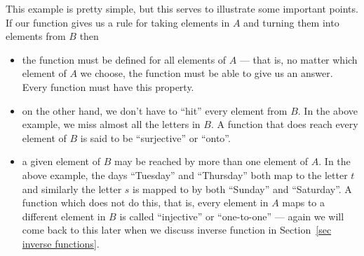 This example is pretty simple, but this serves to illustrate some important
points. If our function gives us a rule for taking elements in $A$ and turning
them into elements from $B$ then
\begin{itemize}
 \item the function must be defined for all elements of $A$ --- that is, no
matter which element of $A$ we choose, the function must be able to give us an
answer. Every function must have this property.
 \item on the other hand, we don't have to ``hit'' every element from $B$. In
the above example, we miss almost all the letters in $B$. A function that does
reach every element of $B$ is said to be ``surjective'' or ``onto''.
\item a given element of $B$ may be reached by more than one element of $A$. In
the above example, the days ``Tuesday'' and ``Thursday'' both map to the
letter $t$ and similarly the letter $s$ is mapped to by both
``Sunday'' and ``Saturday''. A function which does not do this, that is, every
element in $A$ maps to a different element in $B$ is called ``injective'' or
``one-to-one'' --- again we will come back to this later when we discuss inverse function
in Section~\ref{sec inverse functions}.
\end{itemize}

